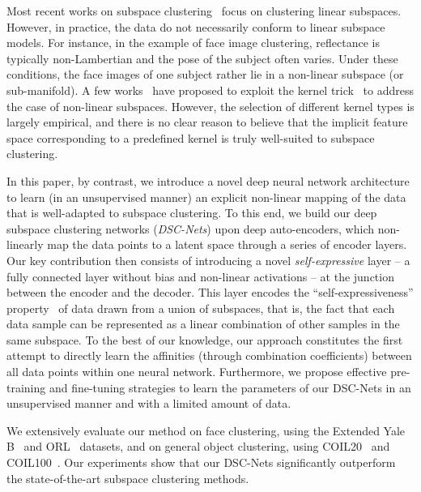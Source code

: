 \documentclass{article}
\begin{document}
Most recent works on subspace clustering~\cite{yan2006general,chen2009spectral,elhamifar2013sparse,liu2013robust, wang2013provable,lu2012robust,ji2015shape,you2016oracle} focus on clustering linear subspaces. However, in practice, the data do not necessarily conform to linear subspace models. For instance, in the example of face image clustering, reflectance is typically non-Lambertian and the pose of the subject often varies. Under these conditions, the face images of one subject rather lie in a non-linear subspace (or sub-manifold). A few works~\cite{chen2009kernel,patel2013latent, patel2014kernel,yin2016kernel,xiao2016robust} have proposed to exploit the kernel trick~\cite{shawe2004kernel} to address the case of non-linear subspaces. However, the selection of different kernel types is largely empirical, and there is no clear reason to believe that the implicit feature space corresponding to a predefined kernel is truly well-suited to subspace clustering.







In this paper, by contrast, we introduce a novel deep neural network architecture to learn (in an unsupervised manner) an explicit non-linear mapping of the data that is well-adapted to subspace clustering. To this end, we build our deep subspace clustering networks (\emph{DSC-Nets}) upon deep auto-encoders, which non-linearly map the data points to a latent space through a series of encoder layers. Our key contribution then consists of introducing a novel \emph{self-expressive} layer -- a fully connected layer without bias and non-linear activations -- at the junction between the encoder and the decoder. This layer encodes the ``self-expressiveness'' property~\cite{rao2008motion,elhamifar2009sparse} of data drawn from a union of subspaces, that is, the fact that each data sample can be represented as a linear combination of other samples in the same subspace. To the best of our knowledge, our approach constitutes the first attempt to directly learn the affinities (through combination coefficients) between all data points within one neural network.
Furthermore, we propose effective pre-training and fine-tuning strategies to learn the parameters of our DSC-Nets in an unsupervised manner and with a limited amount of data. 

We extensively evaluate our method on face clustering, using the Extended Yale B~\cite{lee2005acquiring} and ORL~\cite{samaria1994parameterisation} datasets, and on general object clustering, using COIL20~\cite{coil20} and COIL100~\cite{coil100}.  Our experiments show that our DSC-Nets significantly outperform the state-of-the-art subspace clustering methods. 
\end{document}
